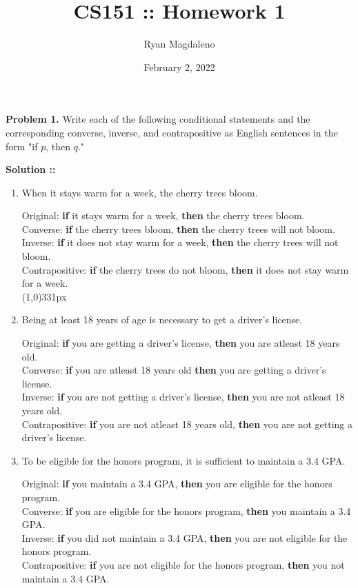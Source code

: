 \documentclass[11pt]{article}
\title{CS151 :: Homework 1}
\date{February 2, 2022}
\author{Ryan Magdaleno}
\begin{document}
\maketitle


\textbf{Problem 1.} Write each of the following conditional statements and the 
corresponding converse, inverse, and contrapositive as English sentences in the form
"if $p$, then $q$."

\vspace{5px}\textbf{Solution ::} 
\begin{enumerate}[label=1.\arabic* ::]
\item 
When it stays warm for a week, the cherry trees bloom.

Original: \textbf{if} it stays warm for a week, \textbf{then} the cherry trees bloom.\\
Converse: \textbf{if} the cherry trees bloom, \textbf{then} the cherry trees will not
bloom.\\
Inverse: \textbf{if} it does not stay warm for a week, \textbf{then} the cherry trees
will not bloom. \\
Contrapositive: \textbf{if} the cherry trees do not bloom, \textbf{then} it does not stay
warm for a week. \\
\line(1,0){331px}

\item 
Being at least 18 years of age is necessary to get a driver's license.

Original: \textbf{if} you are getting a driver's license, \textbf{then} you are atleast
18 years old. \\
Converse: \textbf{if} you are atleast 18 years old \textbf{then} you are getting a 
driver's license.\\
Inverse: \textbf{if} you are not getting a driver's license, \textbf{then} you are not 
atleast 18 years old.\\
Contrapositive: \textbf{if} you are not atleast 18 years old, \textbf{then} you are not
getting a driver's license.\pagebreak

\item
To be eligible for the honors program, it is sufficient to maintain a 3.4 GPA.

Original: \textbf{if} you maintain a 3.4 GPA, \textbf{then} you are eligible for
the honors program.\\
Converse: \textbf{if} you are eligible for the honors program, \textbf{then} you
maintain a 3.4 GPA.\\
Inverse: \textbf{if} you did not maintain a 3.4 GPA, \textbf{then} you are not eligible
for the honors program.\\
Contrapositive: \textbf{if} you are not eligible for the honors program, \textbf{then}
you not maintain a 3.4 GPA.

\end{enumerate}
\pagebreak
\end{document}

